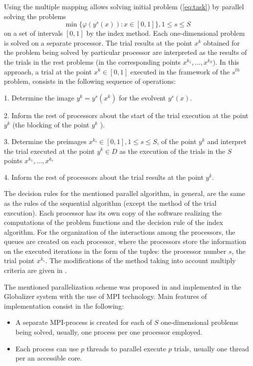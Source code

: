 \documentclass{svproc}
\begin{document}
Using the multiple mapping allows solving initial problem (\ref{eq:task}) by parallel solving the
problems
\[
\min\{\varphi(y^s(x)):x\in [0,1]\}, 1\leqslant s\leqslant S
\]
on a set of intervals $[0,1]$ by the index method. Each one-dimensional problem is solved on a
separate processor. The trial results at the point \(x^k\) obtained for the problem being solved by
particular processor are interpreted as the results of the trials in the rest problems (in the
corresponding points \(x^{k_1},\dots,x^{k_S})\). In this approach, a trial at the point \(x^k \in
[0,1]\) executed in the framework of the \(s^{th}\) problem, consists in the following sequence
of
operations:
\par
1. Determine the image \(y^k=y^s (x^k)\) for the evolvent \(y^s (x)\).
\par
2. Inform the rest of processors about the start of the trial execution at the point \( y^k\) (the
blocking of the point \(y^k\) ).
\par
3. Determine the preimages \(x{}^{k_s}  \in [0,1], 1\leqslant s\leqslant S\), of the point \(y^k\) and
interpret the
trial executed at the point \(y^k \in D \) as the execution of the trials in the \(S\) points
\(x{}^{k_1} ,\dots,x{}^{k_s} \)
\par
4. Inform the rest of processors about the trial results at the point \(y^k\).
\par
The decision rules for the mentioned parallel algorithm, in general, are the same as the rules of the
sequential algorithm (except the method of the trial execution). Each processor has its own copy
of the software realizing the computations of the problem functions and the decision rule of the
index algorithm. For the organization of the interactions among the processors, the queues are
created on each processor, where the processors store the information on the executed iterations
in the form of the tuples: the processor number \(s\), the trial point \(x{}^{k_s}\).
The modifications of the method taking into account multiply criteria are given in \cite{GERGEL2017,Gergel2018}.
\par
The mentioned parallelization scheme was proposed in \cite{Gergel2009} and implemented in the
Globalizer system with the use of MPI technology. Main
features of implementation consist in the following:
\begin{itemize}
  \item A separate MPI-process is created for each
 of \(S\) one-dimensional problems being solved, usually, one process per one processor
 employed.
 \item Each process can use $p$ threads to parallel execute $p$ trials, usually one thread per an
accessible core.
\end{itemize}
\end{document}
